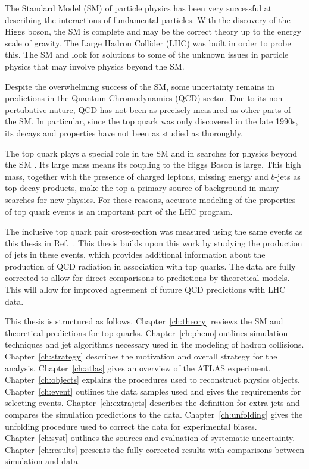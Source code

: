 The Standard Model (SM) of particle physics has been very successful at describing the interactions of fundamental particles. With the discovery of the Higgs boson, the SM is complete and may be the correct theory up to the energy scale of gravity. The Large Hadron Collider (LHC) was built in order to probe this. The SM and look for solutions to some of the unknown issues in particle physics that may involve physics beyond the SM.

Despite the overwhelming success of the SM, some uncertainty remains in predictions in the Quantum Chromodynamics (QCD) sector. Due to its non-pertubative nature, QCD has not been as precisely measured as other parts of the SM. In particular, since the top quark was only discovered in the late 1990s, its decays and properties have not been as studied as thoroughly. 

The top quark plays a special role in the SM and in searches for
physics beyond the SM .  Its large mass means its coupling to the
Higgs Boson is large.  This high mass, together with the presence of 
charged leptons, missing energy and $b$-jets as top decay products,
make the top a primary source of background in many searches for new physics.
For these reasons, accurate modeling of the properties of top quark
events is an important part of the LHC program.

The inclusive top quark pair cross-section was measured using the same events as this thesis in Ref.~\cite{xsec}. This thesis builds upon this work by studying the production of jets in these events, which provides additional information about the production of QCD radiation in association with top quarks. The data are fully corrected to allow for direct comparisons to predictions by theoretical models. This will allow for improved agreement of future QCD predictions with LHC data.

This thesis is structured as follows. Chapter~\ref{ch:theory} reviews the SM and theoretical predictions for top quarks. Chapter~\ref{ch:pheno} outlines simulation techniques and jet algorithms necessary used in the modeling of hadron collisions. Chapter~\ref{ch:strategy} describes the motivation and overall strategy for the analysis. Chapter~\ref{ch:atlas} gives an overview of the ATLAS experiment. Chapter~\ref{ch:objects} explains the procedures used to reconstruct physics objects. Chapter~\ref{ch:event} outlines the data samples used and gives the requirements for selecting events. Chapter~\ref{ch:extrajets} describes the definition for extra jets and compares the simulation predictions to the data. Chapter~\ref{ch:unfolding} gives the unfolding procedure used to correct the data for experimental biases. Chapter~\ref{ch:syst} outlines the sources and evaluation of systematic uncertainty. Chapter~\ref{ch:results} presents the fully corrected results with comparisons between simulation and data.
